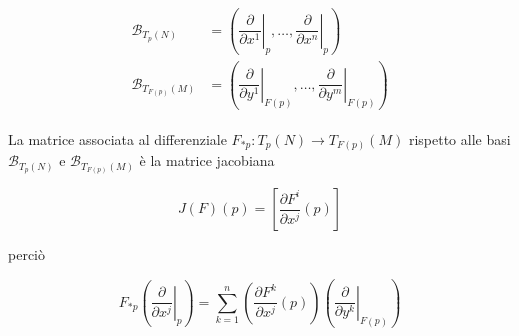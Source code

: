 \begin{align}
	\begin{split}
		\mathcal{B}_{T_{p}(N)} &= \left( \left. \dfrac{\partial}{\partial x^{1}} \right|_{p} , \dots , \left. \dfrac{\partial}{\partial x^{n}} \right|_{p} \right)\\
		\mathcal{B}_{T_{F(p)}(M)} &= \left( \left. \dfrac{\partial}{\partial y^{1}} \right|_{F(p)} , \dots , \left. \dfrac{\partial}{\partial y^{m}} \right|_{F(p)} \right)
	\end{split}
\end{align}

La matrice associata al differenziale $ F_{*p} : T_{p}(N) \to T_{F(p)}(M) $ rispetto alle basi $ \mathcal{B}_{T_{p}(N)} $ e $ \mathcal{B}_{T_{F(p)}(M)} $ è la matrice jacobiana

\begin{equation}
	J(F)(p) = \left[ \dfrac{\partial F^{i}}{\partial x^{j}} (p) \right]
\end{equation}

perciò

\begin{equation}
	F_{*p} \left( \left. \dfrac{\partial}{\partial x^{j}} \right|_{p} \right) = \sum_{k=1}^{n} \left( \dfrac{\partial F^{k}}{\partial x^{j}} (p) \right) \left( \left. \dfrac{\partial}{\partial y^{k}} \right|_{F(p)} \right)
\end{equation}

